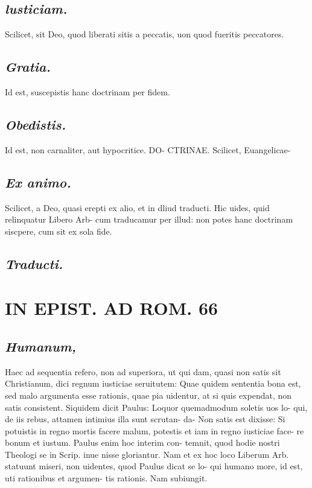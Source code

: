 \documentclass{article}
\begin{document}
\begin{pages}
\subsection*{\textit{lusticiam. }}\pstart Scilicet, sit Deo, quod liberati sitis a peccatis, uon quod fueritis peccatores.   \pend
{}
{}
\subsection*{\textit{Gratia. }}\pstart Id est, suscepistis hanc doctrinam per fidem.   \pend
{}
{}
\subsection*{\textit{Obedistis. }}\pstart Id est, non carnaliter, aut hypocritice. DO- CTRINAE. Scilicet, Euangelicae-  \pend
{}
{}
\subsection*{\textit{Ex animo. }}\pstart Scilicet, a Deo, quasi erepti ex alio, et in dliud traducti. Hic uides, quid relinquatur Libero Arb- cum traducamur per illud: non potes hanc doctrinam siscpere, cum sit ex sola fide.   \pend
{}
{}
\subsection*{\textit{Traducti. }}
\section*{IN EPIST. AD ROM.  66 }
\marginpar{[ p.]}
{}
\subsection*{\textit{Humanum, }}\pstart Haec ad sequentia refero, non ad superiora, ut qui dam, quasi non satis sit Christianum, dici regnum iusticiae seruitutem: Quae quidem sententia bona est, sed malo argumenta esse rationis, quae pia uidentur, at si quis expendat, non satis consistent. Siquidem dicit Paulus: Loquor quemadmodum soletis uos lo- qui, de iis rebus, attamen intimius illa sunt scrutan- da- Non satis est dixisse: Si potuistis in regno mortis facere malum, potestis et iam in regno iusticiae face- re bonum et iustum. Paulus enim hoc interim con- temnit, quod hodie nostri Theologi se in Scrip. inue nisse gloriantur. Nam et ex hoc loco Liberum Arb.  statuunt miseri, non uidentes, quod Paulus dicat se lo- qui humano more, id est, uti rationibus et argumen- tis rationis. Nam subiungit.  \pend
{}
{}

\end{pages}
\end{document}
